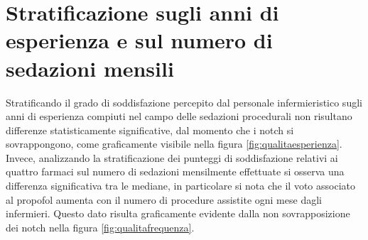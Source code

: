 \vfill

\section{Stratificazione sugli anni di esperienza e sul numero di sedazioni mensili}

Stratificando il grado di soddisfazione percepito dal personale infermieristico sugli anni di esperienza compiuti nel campo delle sedazioni procedurali non risultano differenze statisticamente significative, dal momento che i notch si sovrappongono, come graficamente visibile nella figura \ref{fig:qualitaesperienza}. Invece, analizzando la stratificazione dei punteggi di soddisfazione relativi ai quattro farmaci sul numero di sedazioni mensilmente effettuate si osserva una differenza significativa tra le mediane, in particolare si nota che il voto associato al propofol aumenta con il numero di procedure assistite ogni mese dagli infermieri. Questo dato risulta graficamente evidente dalla non sovrapposizione dei notch nella figura \ref{fig:qualitafrequenza}. 





